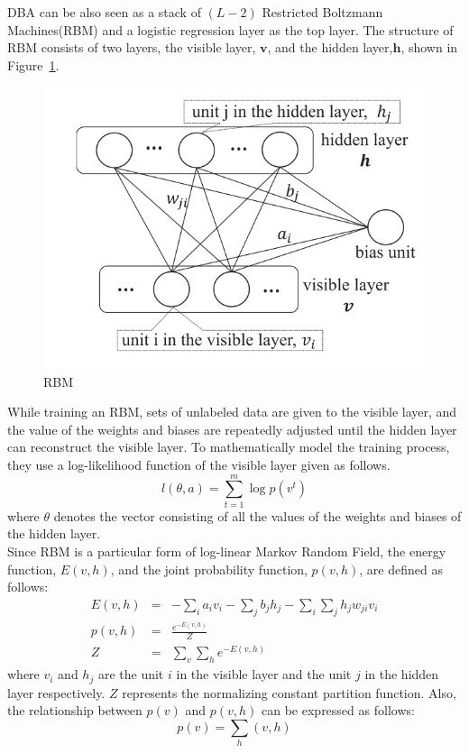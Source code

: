 \documentclass[11pt]{report}
\newcommand{\mb}{\mathbf}
\begin{document}
	\noindent DBA can be also seen as a stack of $\left(L-2\right)$ Restricted Boltzmann Machines(RBM) and a logistic regression layer as the top layer. The structure of RBM consists of two layers, the visible layer, $\mb{v}$, and the hidden layer,$\mb{h}$, shown in Figure~\ref{2ndfig}.
	\begin{figure}[h!]
		\centering
		\includegraphics[width=0.5\linewidth]{figure2.png}
		\caption{RBM}
		\label{2ndfig}
	\end{figure}
	While training an RBM, sets of unlabeled data are given to the visible layer, and the value of the weights and biases are repeatedly adjusted until the hidden layer can reconstruct the visible layer. To mathematically model the training process, they use a log-likelihood function of the visible layer given as follows.
	\begin{equation}
	l\left(\theta,a\right)=\sum_{t=1}^{m}\log{p\left(v^t\right)}
	\end{equation}
	where $\theta$ denotes the vector consisting of all the values of the weights and biases of the hidden layer.\\
	Since RBM is a particular form of log-linear Markov Random Field, the energy function, $E\left(v,h\right)$, and the joint probability function, $p\left(v,h\right)$, are defined as follows:\\
	\begin{eqnarray}
	E\left(v,h\right) &=& -\sum_{i}a_iv_i-\sum_{j}b_jh_j-\sum_{i}\sum_{j}h_jw_{ji}v_i\\
	p\left(v,h\right) &=& \frac{e^{-E\left(v,h\right)}}{Z}\\
	Z &=& \sum_{v}\sum_{h}e^{-E\left(v,h\right)}
	\end{eqnarray}
	where $v_i$ and $h_j$ are the unit $i$ in the visible layer and the unit $j$ in the hidden layer respectively. $Z$ represents the normalizing constant partition function. Also, the relationship between $p\left(v\right)$ and $p\left(v,h\right)$ can be expressed as follows:\\
	\begin{equation}
	p\left(v\right)=\sum_{h}\left(v,h\right)
	\end{equation}
\end{document}
